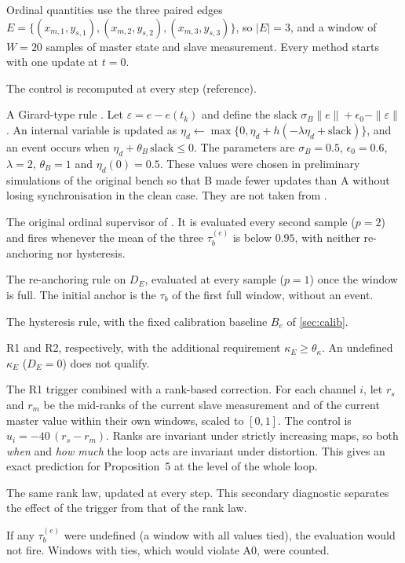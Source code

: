 \documentclass[10pt,a4paper]{article}
\newcommand{\te}{\tau_b^{(e)}}
\newcommand{\R}[1]{\textup{R#1}}
\begin{document}
Ordinal quantities use the three paired edges $E=\{(x_{m,1},y_{s,1}),(x_{m,2},y_{s,2}),(x_{m,3},y_{s,3})\}$, so $|E|=3$, and a window of $W=20$ samples of master state and slave measurement. Every method starts with one update at $t=0$.
\begin{description}[leftmargin=1.2em,style=nextline,itemsep=1pt]
\item[A, continuous] The control is recomputed at every step (reference).
\item[B, dynamic magnitude trigger] A Girard-type rule \citep{girard2015}. Let $\varepsilon=e-e(t_k)$ and define the slack $\sigma_B\|e\|+\epsilon_0-\|\varepsilon\|$. An internal variable is updated as $\eta_d\leftarrow\max\{0,\eta_d+h(-\lambda\eta_d+\text{slack})\}$, and an event occurs when $\eta_d+\theta_B\,\text{slack}\le0$. The parameters are $\sigma_B=0.5$, $\epsilon_0=0.6$, $\lambda=2$, $\theta_B=1$ and $\eta_d(0)=0.5$. These values were chosen in preliminary simulations of the original bench so that B made fewer updates than A without losing synchronisation in the clean case. They are not taken from \citep{taghavifar2026}.
\item[C, naive ordinal level trigger] The original ordinal supervisor of \citep{pv2026miet}. It is evaluated every second sample ($p=2$) and fires whenever the mean of the three $\te$ is below $0.95$, with neither re-anchoring nor hysteresis.
\item[\R{1}] The re-anchoring rule on $D_E$, evaluated at every sample ($p=1$) once the window is full. The initial anchor is the $\tau_b$ of the first full window, without an event.
\item[\R{2}] The hysteresis rule, with the fixed calibration baseline $B_e$ of \cref{sec:calib}.
\item[\R{3}a, \R{3}b] \R{1} and \R{2}, respectively, with the additional requirement $\kappa_E\ge\theta_\kappa$. An undefined $\kappa_E$ ($D_E=0$) does not qualify.
\item[V, ordinal correction] The \R{1} trigger combined with a rank-based correction. For each channel $i$, let $r_s$ and $r_m$ be the mid-ranks of the current slave measurement and of the current master value within their own windows, scaled to $[0,1]$. The control is $u_i=-40\,(r_s-r_m)$. Ranks are invariant under strictly increasing maps, so both \emph{when} and \emph{how much} the loop acts are invariant under distortion. This gives an exact prediction for Proposition~5 at the level of the whole loop.
\item[VA] The same rank law, updated at every step. This secondary diagnostic separates the effect of the trigger from that of the rank law.
\end{description}
If any $\te$ were undefined (a window with all values tied), the evaluation would not fire. Windows with ties, which would violate A0, were counted.
\end{document}
